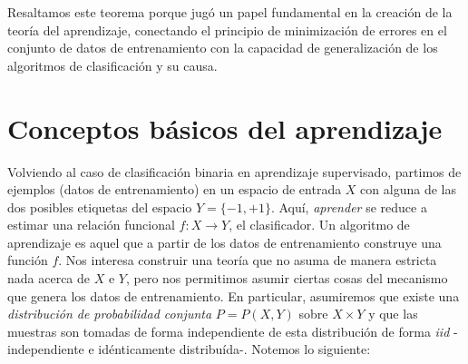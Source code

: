 \documentclass{report}
\begin{document}
Resaltamos este teorema porque jugó un papel fundamental en la creación de la teoría del aprendizaje, conectando el
principio de minimización de errores en el conjunto de datos de entrenamiento con la capacidad de generalización
de los algoritmos de clasificación y su causa.

\section{Conceptos básicos del aprendizaje}

Volviendo al caso de clasificación binaria en aprendizaje supervisado, partimos de ejemplos (datos de entrenamiento) 
en un espacio de entrada $X$ con alguna de las dos posibles etiquetas del espacio $Y=\{-1,+1\}$. Aquí, \textit{aprender}
se reduce a estimar una relación funcional $f:X\rightarrow Y$, el clasificador. Un algoritmo de aprendizaje es aquel
que a partir de los datos de entrenamiento construye una función $f$. Nos interesa construir una teoría que no asuma
de manera estricta nada acerca de $X$ e $Y$, pero nos permitimos asumir ciertas cosas del mecanismo que genera los
datos de entrenamiento. En particular, asumiremos que existe una \textit{distribución de probabilidad conjunta} $P=P(X,Y)$
sobre $X\times Y$ y que las muestras son tomadas de forma independiente de esta distribución de forma \textit{iid} -independiente
e idénticamente distribuída-. Notemos lo siguiente:
\end{document}
